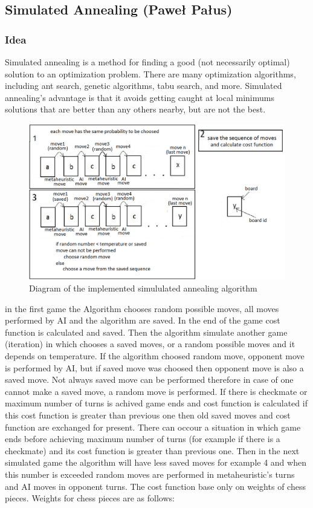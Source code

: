 \documentclass[pdftex]{article}
\begin{document}
\subsection{Simulated Annealing (Paweł Pałus)}
\label{sec:annealing}

\subsubsection{Idea}
Simulated annealing is a method for finding a good (not necessarily optimal) solution to an optimization problem.
There are many optimization algorithms, including ant search, genetic algorithms, tabu search, and more. Simulated annealing's advantage is that it avoids getting caught at local minimums solutions that are better than any others nearby, but are not the best.

\begin{figure}[!htb]
	\centering
	\includegraphics[width=1\textwidth]{annealing/annealingSchema.png} 
	\caption{Diagram of the implemented simululated annealing algorithm}
	\label{fig:annealingSchema}
\end{figure}

in the first game the Algorithm chooses random possible moves, all moves performed by AI and the algorithm are saved. In the end of the game cost function is calculated and saved. Then the algorithm simulate another game (iteration) in which chooses a saved moves, or a random possible moves and it depends on temperature. If the algorithm choosed random move, opponent move is performed by AI, but if saved move was choosed then opponent move is also a saved move. Not always saved move can be performed therefore in case of one cannot make a saved move, a random move is performed. If there is checkmate or maximum number of turns is achived game ends and cost function is calculated if this cost function is greater than previous one then old saved moves and cost function are exchanged for present. There can occour a situation in which game ends before achieving maximum number of turns (for example if there is a checkmate) and its cost function is greater than previous one. Then in the next simulated game the algorithm will have less saved moves for example 4 and when this number is exceeded random moves are performed in metaheuristic's turns and AI moves in opponent turns. The cost function base only on weights of chess pieces. Weights for chess pieces are as follows:
\end{document}
